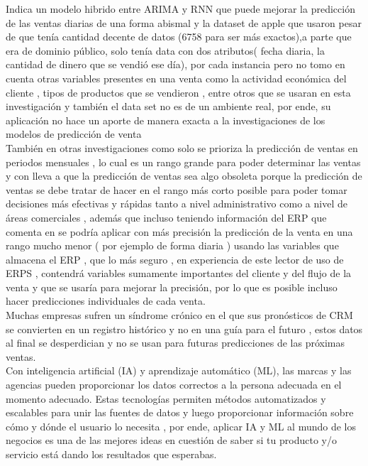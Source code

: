 \documentclass[conference]{IEEEtran}
\begin{document}
Indica un modelo hibrido entre ARIMA y RNN\cite{b4} que puede mejorar la predicción de las ventas diarias de una forma abismal y la dataset 
de apple que usaron pesar de que tenía cantidad decente de datos (6758 para ser más exactos),a parte que era de dominio público, solo 
tenía data con dos atributos( fecha diaria, la cantidad de dinero que se vendió ese día), por cada instancia pero no tomo en cuenta otras 
variables presentes en una venta como la actividad económica del cliente , tipos de productos que se vendieron , entre otros que se 
usaran en esta investigación y también el data set no es de un ambiente real, por ende, su aplicación no hace un aporte de manera exacta a 
la investigaciones de los modelos de predicción de venta\\

También en otras investigaciones como \cite{b15} solo se prioriza la predicción de ventas en periodos mensuales , lo cual es un rango grande 
para poder determinar las ventas y con lleva a que la predicción de ventas sea algo obsoleta porque la predicción de ventas se debe tratar de 
hacer en el rango más corto posible para poder tomar decisiones más efectivas y rápidas tanto a nivel administrativo como a nivel de áreas 
comerciales , además que incluso teniendo información del ERP que comenta en \cite{b15} se podría aplicar con más precisión la predicción de 
la venta en una rango mucho menor ( por ejemplo de forma diaria ) usando las variables que almacena el ERP , que lo más seguro , en experiencia 
de este lector de uso de ERPS , contendrá variables sumamente importantes del cliente y del flujo de la venta y que se usaría para mejorar 
la precisión, por lo que es posible incluso hacer predicciones individuales de cada venta.\\

Muchas empresas sufren un síndrome crónico en el que sus pronósticos de CRM se convierten en un registro histórico y no en una guía para el 
futuro \cite{b16}, estos datos al final se desperdician y no se usan para futuras predicciones de las próximas ventas.\\

Con inteligencia artificial (IA) y aprendizaje automático (ML), las marcas y las agencias pueden proporcionar los datos correctos a la persona 
adecuada en el momento adecuado. Estas tecnologías permiten métodos automatizados y escalables para unir las fuentes de datos y luego proporcionar 
información sobre cómo y dónde el usuario lo necesita \cite{b17} , por ende, aplicar IA y ML al mundo de los negocios es una de las mejores ideas 
en cuestión de saber si tu producto y/o servicio está dando los resultados que esperabas.\\
\end{document}
